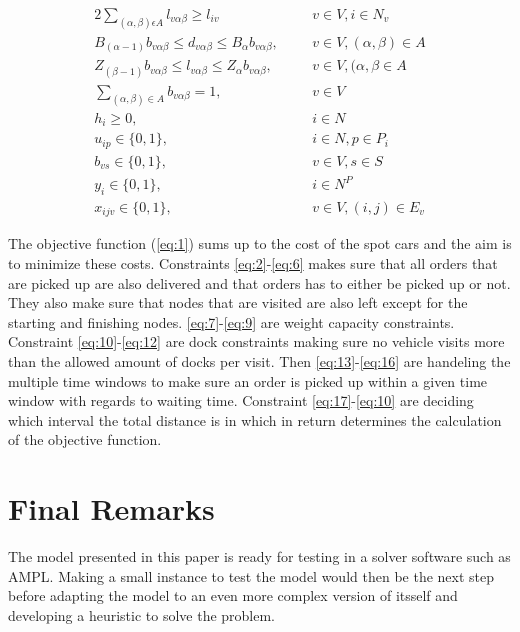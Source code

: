 \documentclass[a4paper,10pt]{article}
\begin{document}
\begin{alignat} {2}
	\sum_{(\alpha,\beta) \epsilon A} l_{v\alpha\beta} \geq l_{iv}		&	&& 	v \in V, i \in N_v				\label{eq:18}	\\[4pt]
	B_{(\alpha-1)}b_{v\alpha\beta} \leq d_{v\alpha\beta} \leq 
	B_\alpha b_{v\alpha\beta},						& 	&&	v \in V, (\alpha, \beta) \in A			\label{eq:19}	\\[8pt]
 	Z_{(\beta-1)}b_{v\alpha\beta} \leq l_{v\alpha\beta} \leq 
	Z_\alpha b_{v\alpha\beta},						& 	&&	v \in V, (\alpha, \beta \in A 			\label{eq:20}	\\[8pt]   	
	\sum_{(\alpha, \beta) \in A} b_{v\alpha\beta} = 1,			& 	&&	v \in V						\label{eq:21}	\\[4pt]
    	h_{i} \geq 0,								& 	&&	i \in N 					\label{eq:22}	\\[8pt]
    	u_{ip} \in \{0, 1\},							& 	&&	i \in N, p \in P_i 				\label{eq:23}	\\[8pt]
    	b_{vs} \in \{0, 1\},							& 	&&	v \in V, s \in S 				\label{eq:24}	\\[8pt]
    	y_i \in \{0, 1\},							& 	&&	i \in N^P 					\label{eq:25}	\\[8pt]
    	x_{ijv} \in \{0, 1\},							&	&&	v \in V, (i, j) \in E_v 			\label{eq:26}
\end{alignat} 
\endgroup

\par
The objective function (\ref{eq:1}) sums up to the cost of the spot cars and the aim is to minimize these costs. 
Constraints \ref{eq:2}-\ref{eq:6} makes sure that all orders that are picked up are also delivered and that orders has to either be picked up or not. They also make sure that nodes that are visited are also left except for the starting and finishing nodes.
\ref{eq:7}-\ref{eq:9} are weight capacity constraints.
Constraint \ref{eq:10}-\ref{eq:12} are dock constraints making sure no vehicle visits more than the allowed amount of docks per visit.
Then \ref{eq:13}-\ref{eq:16} are handeling the multiple time windows to make sure an order is picked up within a given time window with regards to waiting time.
Constraint \ref{eq:17}-\ref{eq:10} are deciding which interval the total distance is in which in return determines the calculation of the objective function. \newline

\section{Final Remarks}
The model presented in this paper is ready for testing in a solver software such as AMPL. Making a small instance to test the model would then be the next step before adapting the model to an even more complex version of itsself and developing a heuristic to solve the problem. 




\end{document}
